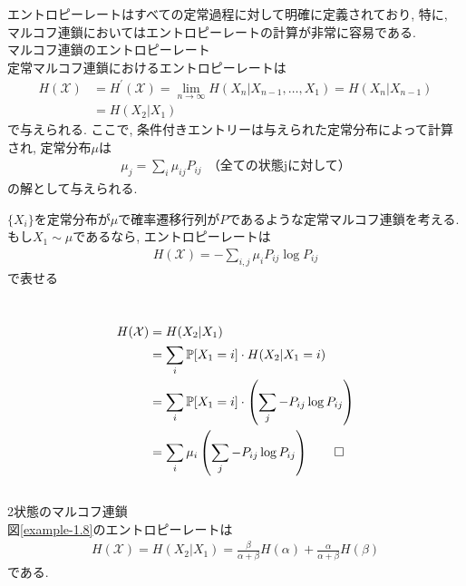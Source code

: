 \documentclass[a4j]{jsarticle}
\begin{document}
エントロピーレートはすべての定常過程に対して明確に定義されており, 特に, マルコフ連鎖においてはエントロピーレートの計算が非常に容易である.\\

 マルコフ連鎖のエントロピーレート\\

定常マルコフ連鎖におけるエントロピーレートは
\begin{align}
	H(\mathcal{X}) & = H^\prime(\mathcal{X}) = \lim_{n \rightarrow \infty} H(X_n | X_{n-1}, \ldots, X_1) = H(X_n | X_{n-1}) \\
	               & = H(X_2 | X_1)
\end{align}
で与えられる. ここで, 条件付きエントリーは与えられた定常分布によって計算され, 定常分布$\mu$は
\begin{align}
	\mu_j = \sum_{i} \mu_{ij}P_{ij} \:\: \text{（全ての状態jに対して）}
\end{align}
の解として与えられる.\\

\begin{itembox}[l]{}
	$\{X_i\}$を定常分布が$\mu$で確率遷移行列が$P$であるような定常マルコフ連鎖を考える. もし$X_1 \sim \mu$であるなら, エントロピーレートは
	\begin{align}
		H(\mathcal{X}) = - \sum_{i, j} \mu_i P_{ij} \log P_{ij}
	\end{align}
	で表せる
\end{itembox}\\

\begin{align}
	H(\mathcal{X}) & = H(X_2|X_1)                                                                           \\
	               & = \sum_{i} \mathbb{P}[X_1 = i] \cdot H(X_2 | X_1 = i)                                  \\
	               & =       \sum_{i} \mathbb{P}[X_1 = i] \cdot \left( \sum_{j} -P_{ij} \log P_{ij} \right)
	\\
	               & = \sum_{i} \mu_{i} \left( \sum_{j} -P_{ij} \log P_{ij} \right) \qed
\end{align}\\

 2状態のマルコフ連鎖\\

図\ref{example-1.8}のエントロピーレートは
\begin{align}
	H(\mathcal{X}) = H(X_2|X_1) = \frac{\beta}{\alpha + \beta}H(\alpha) + \frac{\alpha}{\alpha + \beta}H(\beta)
\end{align}
である.\\
\end{document}
